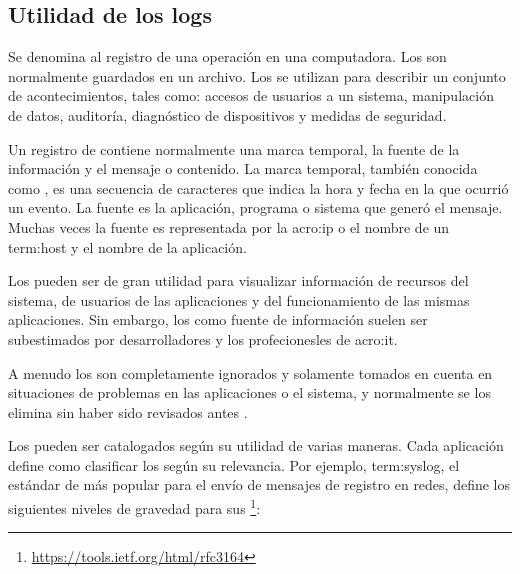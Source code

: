 \subsection{Utilidad de los logs}
\label{utilidad-de-los-logs}

Se denomina  al registro de una operación en una computadora. Los
 son normalmente guardados en un archivo. Los  se utilizan
para describir un conjunto de acontecimientos, tales como: accesos de usuarios
a un sistema, manipulación de datos, auditoría, diagnóstico de dispositivos y
medidas de seguridad.

Un registro de  contiene normalmente una marca temporal, la fuente de
la información y el mensaje o contenido. La marca temporal, también conocida
como , es una secuencia de caracteres que indica la hora y fecha
en la que ocurrió un evento. La fuente es la aplicación, programa o sistema que
generó el mensaje. Muchas veces la fuente es representada por la \gls{acro:ip}
o el nombre de un \gls{term:host} y el nombre de la aplicación.

Los  pueden ser de gran utilidad para visualizar información de
recursos del sistema, de usuarios de las aplicaciones y del funcionamiento de
las mismas aplicaciones. Sin embargo, los  como fuente de información
suelen ser subestimados por desarrolladores y los profecionesles de
\gls{acro:it}.

A menudo los  son completamente ignorados y solamente tomados en
cuenta en situaciones de problemas en las aplicaciones o el sistema, y
normalmente se los elimina sin haber sido revisados antes
\cite[p.~16]{monitoreo:logging_and_log_management}.

Los  pueden ser catalogados según su utilidad de varias maneras. Cada
aplicación define como clasificar los  según su relevancia. Por
ejemplo, \gls{term:syslog}, el estándar de más popular para el envío de
mensajes de registro en redes, define los siguientes niveles de gravedad para
sus \footnote{\url{https://tools.ietf.org/html/rfc3164}}:

